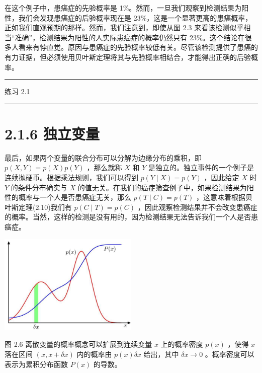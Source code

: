 \documentclass[10pt]{report}
\newcommand{\HRule}{\begin{center}\rule{0.9\linewidth}{0.2mm}\end{center}}
\begin{document}
在这个例子中，患癌症的先验概率是 1\%。然而，一旦我们观察到检测结果为阳性，我们会发现患癌症的后验概率现在是 23\%，这是一个显著更高的患癌概率，正如我们直观预期的那样。然而，我们注意到，即使从图 2.3 来看该检测似乎相当“准确”，检测结果为阳性的人实际患癌症的概率仍然只有 23\%。这个结论在很多人看来有悖直觉。原因与患癌症的先验概率较低有关。尽管该检测提供了患癌的有力证据，但必须使用贝叶斯定理将其与先验概率相结合，才能得出正确的后验概率。

\HRule

练习 2.1

\HRule

\section*{2.1.6 独立变量}

最后，如果两个变量的联合分布可以分解为边缘分布的乘积，即 \(p\left( {X,Y}\right)  = p\left( X\right) p\left( Y\right)\) ，那么就称 \(X\) 和 \(Y\) 是独立的。独立事件的一个例子是连续抛硬币。根据乘法规则，我们可以得到 \(p\left( {Y \mid  X}\right)  = p\left( Y\right)\) ，因此给定 \(X\) 时 \(Y\) 的条件分布确实与 \(X\) 的值无关。在我们的癌症筛查例子中，如果检测结果为阳性的概率与一个人是否患癌症无关，那么 \(p\left( {T \mid  C}\right)  = p\left( T\right)\) ，这意味着根据贝叶斯定理(2.10)我们有 \(p\left( {C \mid  T}\right)  = p\left( C\right)\) ，因此观察检测结果并不会改变患癌症的概率。当然，这样的检测是没有用的，因为检测结果无法告诉我们一个人是否患癌症。

\begin{center}
\includegraphics[max width=0.5\textwidth]{images/0194e279-9b28-703a-88f4-c3ac21e2010d_51_879_344_672_483_0.jpg}
\end{center}
\hspace*{3em} 

图 2.6 离散变量的概率概念可以扩展到连续变量 \(x\) 上的概率密度 \(p\left( x\right)\) ，使得 \(x\) 落在区间 \(\left( {x,x + {\delta x}}\right)\) 内的概率由 \(p\left( x\right) {\delta x}\) 给出，其中 \({\delta x} \rightarrow  0\) 。概率密度可以表示为累积分布函数 \(P\left( x\right)\) 的导数。
\end{document}
